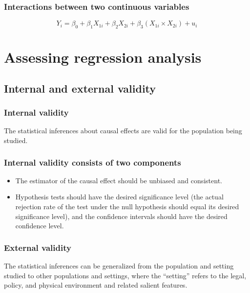 \documentclass[a4paper,10pt]{article}
\begin{document}
\subsubsection*{Interactions between two continuous variables}
\label{sec:orgff4c0b5}
\begin{equation}
\label{eq:interact-xx}
Y_i = \beta_0 + \beta_1 X_{1i} + \beta_2 X_{2i} + \beta_3 (X_{1i} \times X_{2i}) + u_i
\end{equation}

\section{Assessing regression analysis}
\label{sec:org62c8dff}
\subsection{Internal and external validity}
\label{sec:org21983c6}
\subsubsection*{Internal validity}
\label{sec:org94f646e}

The statistical inferences about causal effects are valid for the
population being studied.

\subsubsection*{Internal validity consists of two components}
\label{sec:org6b79d06}

\begin{itemize}
\item The estimator of the causal effect should be unbiased and
consistent.
\item Hypothesis tests should have the desired significance level (the
actual rejection rate of the test under the null hypothesis should
equal its desired significance level), and the confidence intervals
should have the desired confidence level.
\end{itemize}

\subsubsection*{External validity}
\label{sec:org7836f89}

The statistical inferences can be generalized from the population and
setting studied to other populations and settings, where the
“setting” refers to the legal, policy, and physical environment
and related salient features.
\end{document}
